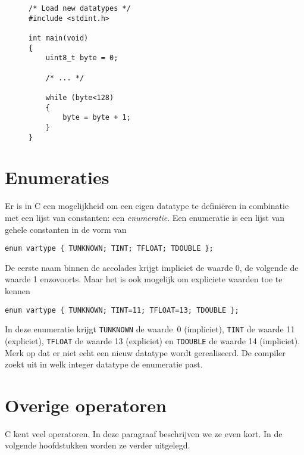 \begin{figure}[!ht]
\begin{lstlisting}[caption=Voorbeeld van het gebruik van vaste-lengte datatypes.,label=cod:vastelengte]
/* Load new datatypes */
#include <stdint.h>

int main(void)
{
    uint8_t byte = 0;
    
    /* ... */
    
    while (byte<128)
    {
        byte = byte + 1;
    }
}
\end{lstlisting}
\end{figure}


\section{Enumeraties}
\label{sec:enumeraties}
Er is in C een mogelijkheid om een eigen datatype te definiëren in combinatie met een lijst van constanten: een \textsl{enumeratie}. Een enumeratie is een lijst van gehele constanten in de vorm van

\hspace*{1em}\texttt{enum vartype \{ TUNKNOWN; TINT; TFLOAT; TDOUBLE \};}

De eerste naam binnen de accolades krijgt impliciet de waarde 0, de volgende de waarde 1 enzovoorts. Maar het is ook mogelijk om expliciete waarden toe te kennen

\hspace*{1em}\texttt{enum vartype \{ TUNKNOWN; TINT=11; TFLOAT=13; TDOUBLE \};}

In deze enumeratie krijgt \texttt{TUNKNOWN} de waarde~0 (impliciet), \texttt{TINT} de waarde 11 (expliciet), \texttt{TFLOAT} de waarde 13 (expliciet) en \texttt{TDOUBLE} de waarde 14 (impliciet). Merk op dat er niet echt een nieuw datatype wordt gerealiseerd. De compiler zoekt uit in welk integer datatype de enumeratie past.


\section{Overige operatoren}
C kent veel operatoren. In deze paragraaf beschrijven we ze even kort. In de volgende hoofdstukken worden ze verder uitgelegd.

